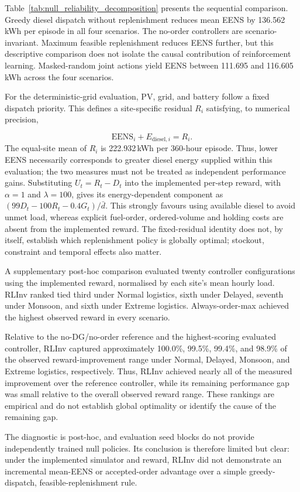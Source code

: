 \begin{revisedblock}
\begin{sloppypar}
Table~\ref{tab:null_reliability_decomposition}
presents the sequential comparison. Greedy diesel
dispatch without replenishment reduces mean EENS
by 136.562\,kWh per episode in all four scenarios.
The no-order controllers are scenario-invariant.
Maximum feasible replenishment reduces EENS further,
but this descriptive comparison does not isolate
the causal contribution of reinforcement learning.
Masked-random joint actions yield EENS between
111.695 and 116.605\,kWh across the four scenarios.
\end{sloppypar}
For the deterministic-grid evaluation, PV,
grid, and battery follow a fixed dispatch
priority. This defines a site-specific
residual $R_i$ satisfying, to numerical
precision,

\begin{equation}
  \mathrm{EENS}_i + E_{\mathrm{diesel},i} = R_i.
  \label{eq:null_fixed_residual}
\end{equation}
The equal-site mean of $R_i$ is 222.932\,kWh per 360-hour episode.
Thus, lower EENS necessarily corresponds to greater diesel energy
supplied within this evaluation; the two measures must not be treated
as independent performance gains. Substituting
$U_t=R_t-D_t$ into the implemented per-step reward, with
$\alpha=1$ and $\lambda=100$, gives its energy-dependent component
as $(99D_t-100R_t-0.4G_t)/\bar d$. This strongly favours using
available diesel to avoid unmet load, whereas explicit fuel-order,
ordered-volume and holding costs are absent from the implemented
reward. The fixed-residual identity does not, by itself, establish
which replenishment policy is globally optimal; stockout, constraint
and temporal effects also matter.


A supplementary post-hoc comparison evaluated
twenty controller configurations using the
implemented reward, normalised by each site's
mean hourly load. RLInv ranked tied third under
Normal logistics, sixth under Delayed, seventh
under Monsoon, and sixth under Extreme logistics.
Always-order-max achieved the highest observed
reward in every scenario.

Relative to the no-DG/no-order reference and the
highest-scoring evaluated controller, RLInv
captured approximately 100.0\%, 99.5\%, 99.4\%,
and 98.9\% of the observed reward-improvement
range under Normal, Delayed, Monsoon, and
Extreme logistics, respectively. Thus, RLInv
achieved nearly all of the measured improvement
over the reference controller, while its remaining
performance gap was small relative to the overall
observed reward range. These rankings are
empirical and do not establish global optimality
or identify the cause of the remaining gap.


The diagnostic is post-hoc, and evaluation seed blocks do not provide
independently trained null policies. Its conclusion is therefore
limited but clear: under the implemented simulator and reward,
RLInv did not demonstrate an incremental mean-EENS or accepted-order
advantage over a simple greedy-dispatch, feasible-replenishment rule.
\end{revisedblock}

